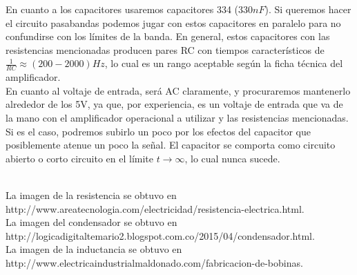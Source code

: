 \documentclass[prb,aps,preprintnumbers,amsmath,amssymb]{revtex4}
\begin{document}
En cuanto a los capacitores usaremos capacitores 334 ($330n F$). Si queremos hacer el circuito pasabandas podemos jugar con estos capacitores en paralelo para no confundirse con los límites de la banda. En general, estos capacitores con las resistencias mencionadas producen pares RC con tiempos característicos de $\frac{1}{RC} \approx (200-2000) Hz$, lo cual es un rango aceptable según la ficha técnica del amplificador.\\

En cuanto al voltaje de entrada, será AC claramente, y procuraremos mantenerlo alrededor de los 5V, ya que, por experiencia, es un voltaje de entrada que va de la mano con el amplificador operacional a utilizar y las resistencias mencionadas. Si es el caso, podremos subirlo un poco por los efectos del capacitor que posiblemente atenue un poco la señal. El capacitor se comporta como circuito abierto o corto circuito en el límite $t\rightarrow\infty$, lo cual nunca sucede.\\

\begin{thebibliography}{99}
\
\\
 La imagen de la resistencia se obtuvo en http://www.areatecnologia.com/electricidad/resistencia-electrica.html.\\

 La imagen del condensador se obtuvo en http://logicadigitaltemario2.blogspot.com.co/2015/04/condensador.html.\\

 La imagen de la inductancia se obtuvo en http://www.electricaindustrialmaldonado.com/fabricacion-de-bobinas.\\


\end{thebibliography}
\end{document}
